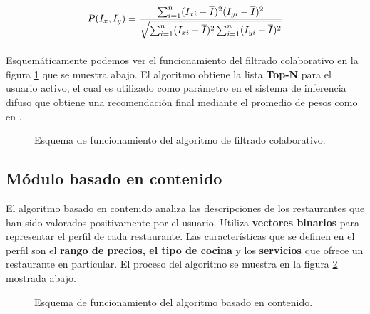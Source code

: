\documentclass[12pt,letterpaper,oneside] {memoir}
\begin{document}
\begin{equation}
\displaystyle
P(I_{x}, I_{y}) = {\sum_{i=1}^{n}(I_{xi} - \overline{I})^2 (I_{yi}- \overline{I})^2 \over  
\sqrt{\sum_{i=1}^{n}(I_{xi}- \overline{I})^2 \sum_{i=1}^{n}(I_{yi}- \overline{I})^2}}
\end{equation}

\paragraph{}
Esquemáticamente  podemos ver el funcionamiento del filtrado colaborativo en la figura \ref{fig:filtradoColaborativo} que se muestra abajo. El algoritmo obtiene la lista \textbf{Top-N} para el usuario activo, el cual es utilizado como parámetro en el sistema de inferencia difuso que obtiene una recomendación final  mediante el promedio de pesos como en \citep{Garciavaldez2009}.

\begin{figure}[H] 
\centering 
{} \caption{Esquema de funcionamiento del algoritmo de filtrado colaborativo.} 
\label{fig:filtradoColaborativo} 
\end{figure}

\subsection{Módulo basado en contenido}

El algoritmo basado en contenido analiza las descripciones de los restaurantes que han sido valorados positivamente por el usuario. Utiliza \textbf{vectores binarios} para representar el perfil de cada restaurante. Las características que se definen en el perfil son el \textbf{rango de precios, el tipo de cocina} y los \textbf{servicios} que ofrece un  restaurante en particular. El proceso del algoritmo se muestra en la figura \ref{fig:basadoContenido} mostrada abajo.\\

\begin{figure}[H] 
\centering 
{} \caption{Esquema de funcionamiento del algoritmo basado en contenido.} 
\label{fig:basadoContenido} 
\end{figure}
\end{document}
